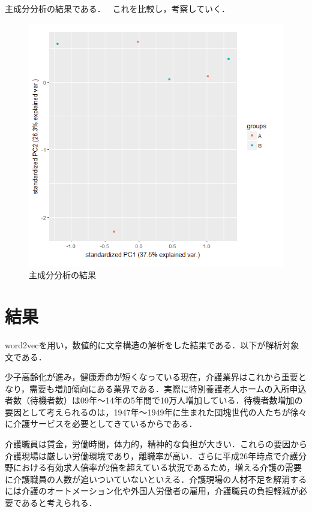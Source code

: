 主成分分析の結果である．　
これを比較し，考察していく．

\begin{figure}[htb]
\centering
\includegraphics[width=13cm]{4-38.png}
\caption{主成分分析の結果}\label{4-38}
\end{figure}
\newpage

\chapter{結果}

word2vecを用い，数値的に文章構造の解析をした結果である．以下が解析対象文である．

少子高齢化が進み，健康寿命が短くなっている現在，介護業界はこれから重要となり，需要も増加傾向にある業界である．実際に特別養護老人ホームの入所申込者数（待機者数）は09年～14年の5年間で10万人増加している．待機者数増加の要因として考えられるのは，1947年～1949年に生まれた団塊世代の人たちが徐々に介護サービスを必要としてきているからである．

介護職員は賃金，労働時間，体力的，精神的な負担が大きい．これらの要因から介護現場は厳しい労働環境であり，離職率が高い．さらに平成26年時点で介護分野における有効求人倍率が2倍を超えている状況であるため，増える介護の需要に介護職員の人数が追いついていないといえる．介護現場の人材不足を解消するには介護のオートメーション化や外国人労働者の雇用，介護職員の負担軽減が必要であると考えられる．

